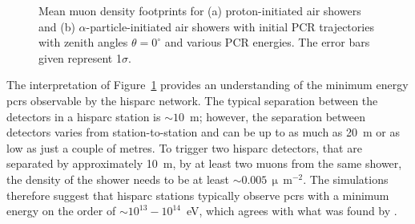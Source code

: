 \begin{figure}[ht!]
	\centering
	\qquad
	\caption{Mean muon density footprints for (a) proton-initiated air showers and (b) $\alpha$-particle-initiated air showers with initial PCR trajectories with zenith angles $\theta=0^{\circ}$ and various PCR energies. The error bars given represent 1$\sigma$.} \label{fig:shower_footprints}
\end{figure}

The interpretation of Figure~\ref{fig:shower_footprints} provides an understanding of the minimum energy \glspl{pcr} observable by the \gls{hisparc} network. The typical separation between the detectors in a \gls{hisparc} station is $\sim10$~m; however, the separation between detectors varies from station-to-station and can be up to as much as 20~m or as low as just a couple of metres. To trigger two \gls{hisparc} detectors, that are separated by approximately 10~m, by at least two muons from the same shower, the density of the shower needs to be at least $\sim 0.005 \, \upmu \, \mathrm{m}^{-2}$. The simulations therefore suggest that \gls{hisparc} stations typically observe \glspl{pcr} with a minimum energy on the order of $\sim 10^{13} - 10^{14}$~eV, which agrees with what was found by \cite{van_dam_hisparc_2020}.

